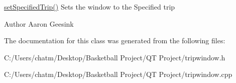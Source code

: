 \mbox{\hyperlink{class_trip_window_a218b804ec1d07721d0b5b69aeacfdc25}{set\+Specified\+Trip()}} Sets the window to the Specified trip 

\begin{DoxyAuthor}{Author}
Aaron Geesink 
\end{DoxyAuthor}


The documentation for this class was generated from the following files\+:\begin{DoxyCompactItemize}
\item 
C\+:/\+Users/chatm/\+Desktop/\+Basketball Project/\+Q\+T Project/tripwindow.\+h\item 
C\+:/\+Users/chatm/\+Desktop/\+Basketball Project/\+Q\+T Project/tripwindow.\+cpp\end{DoxyCompactItemize}
